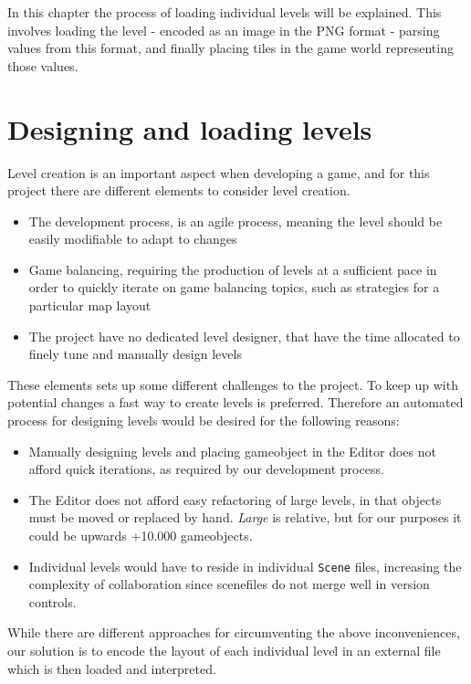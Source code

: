 In this chapter the process of loading individual levels will be explained. This involves loading the level - encoded as an image in the PNG format -
parsing values from this format, and finally placing tiles in the game world
representing those values.

\section{Designing and loading levels}
Level creation is an important aspect when developing a game, and for this project there are different elements to consider level creation.
\begin{itemize}
    \item The development process, is an agile process, meaning the level should be easily modifiable to adapt to changes
    
    \item Game balancing, requiring the production of levels at a sufficient pace in
        order to quickly iterate on game balancing topics, such as strategies
        for a particular map layout
        
    \item The project have no dedicated level designer, that have the time
        allocated to finely tune and manually design levels
\end{itemize}
These elements sets up some different challenges to the project.  
To keep up with potential changes a fast way to create levels is preferred.
Therefore an automated process for designing levels would be desired for the following reasons:
\begin{itemize}
    \item Manually designing levels and placing gameobject in the Editor does
        not afford quick iterations, as required by our development process.
    \item The Editor does not afford easy refactoring of large levels, in that
        objects must be moved or replaced by hand. \textit{Large} is relative,
        but for our purposes it could be upwards +10.000 gameobjects.
    \item Individual levels would have to reside in individual \texttt{Scene}
        files, increasing the complexity of collaboration since scenefiles do
        not merge well in version controls.
\end{itemize}
While there are different approaches for circumventing the above inconveniences, our solution is to encode the layout of each individual level in an external file which is then loaded and interpreted. 
